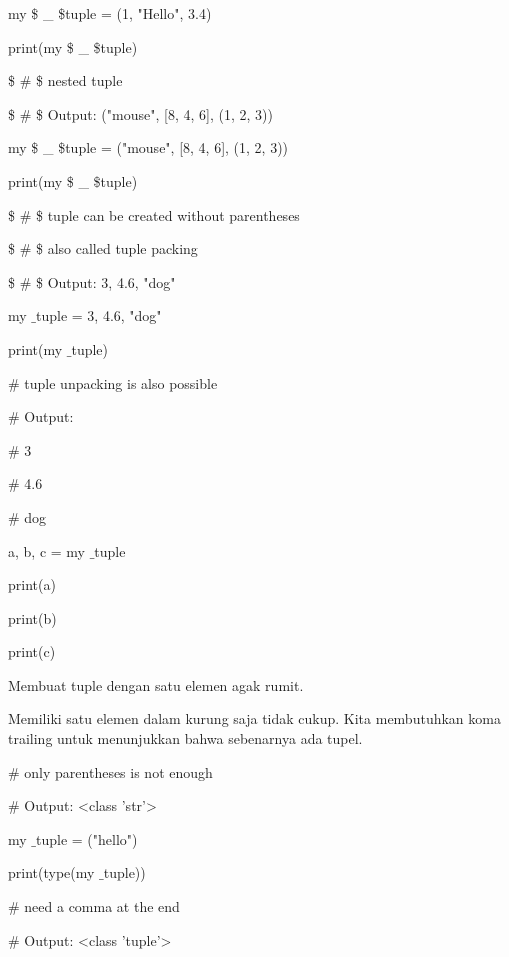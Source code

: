 my \$  \_  \$tuple = (1, "Hello", 3.4) \par
print(my \$  \_  \$tuple) \par
\vspace{12pt}
 \$  \#  \$ nested tuple \par
 \$  \#  \$ Output: ("mouse", [8, 4, 6], (1, 2, 3)) \par
my \$  \_  \$tuple = ("mouse", [8, 4, 6], (1, 2, 3)) \par
print(my \$  \_  \$tuple) \par
\vspace{12pt}
 \$  \#  \$ tuple can be created without parentheses \par
 \$  \#  \$ also called tuple packing \par
 \$  \#  \$ Output: 3, 4.6, "dog" \par
\vspace{12pt}
my $  \_  $tuple = 3, 4.6, "dog" \par
print(my $  \_  $tuple) \par
\vspace{12pt}
 $  \#  $ tuple unpacking is also possible \par
 $  \#  $ Output: \par
 $  \#  $ 3 \par
 $  \#  $ 4.6 \par
 $  \#  $ dog \par
a, b, c = my $  \_  $tuple \par
print(a) \par
print(b) \par
print(c) \par
\vspace{12pt}
Membuat tuple dengan satu elemen agak rumit. \par
\vspace{12pt}
Memiliki satu elemen dalam kurung saja tidak cukup. Kita membutuhkan koma trailing untuk menunjukkan bahwa sebenarnya ada tupel. \par
\vspace{12pt}
 $  \#  $ only parentheses is not enough \par
 $  \#  $ Output: <class 'str'> \par
my $  \_  $tuple = ("hello") \par
print(type(my $  \_  $tuple)) \par
\vspace{12pt}
 $  \#  $ need a comma at the end \par
 $  \#  $ Output: <class 'tuple'> \par
